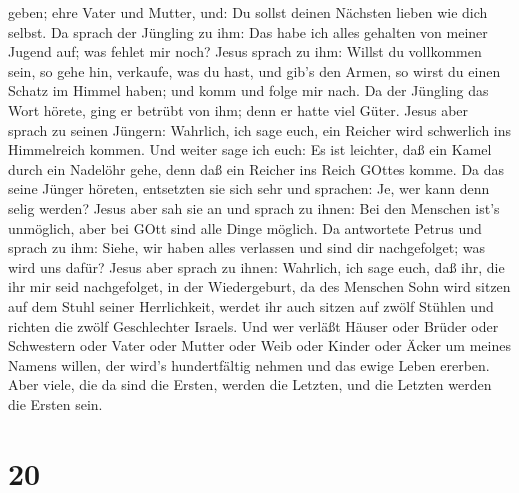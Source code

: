 geben;  ehre Vater und Mutter, und: Du sollst deinen
Nächsten lieben wie dich selbst.  Da sprach der Jüngling zu
ihm: Das habe ich alles gehalten von meiner Jugend auf; was fehlet mir
noch?  Jesus sprach zu ihm: Willst du vollkommen sein, so
gehe hin, verkaufe, was du hast, und gib's den Armen, so wirst du einen
Schatz im Himmel haben; und komm und folge mir nach.  Da
der Jüngling das Wort hörete, ging er betrübt von ihm; denn er hatte
viel Güter.  Jesus aber sprach zu seinen Jüngern: Wahrlich,
ich sage euch, ein Reicher wird schwerlich ins Himmelreich kommen.
 Und weiter sage ich euch: Es ist leichter, daß ein Kamel
durch ein Nadelöhr gehe, denn daß ein Reicher ins Reich GOttes komme.
 Da das seine Jünger höreten, entsetzten sie sich sehr und
sprachen: Je, wer kann denn selig werden?  Jesus aber sah
sie an und sprach zu ihnen: Bei den Menschen ist's unmöglich, aber bei
GOtt sind alle Dinge möglich.  Da antwortete Petrus und
sprach zu ihm: Siehe, wir haben alles verlassen und sind dir
nachgefolget; was wird uns dafür?  Jesus aber sprach zu
ihnen: Wahrlich, ich sage euch, daß ihr, die ihr mir seid nachgefolget,
in der Wiedergeburt, da des Menschen Sohn wird sitzen auf dem Stuhl
seiner Herrlichkeit, werdet ihr auch sitzen auf zwölf Stühlen und
richten die zwölf Geschlechter Israels.  Und wer verläßt
Häuser oder Brüder oder Schwestern oder Vater oder Mutter oder Weib oder
Kinder oder Äcker um meines Namens willen, der wird's hundertfältig
nehmen und das ewige Leben ererben.  Aber viele, die da
sind die Ersten, werden die Letzten, und die Letzten werden die Ersten
sein.

\hypertarget{section-19}{%
\section{20}\label{section-19}}

